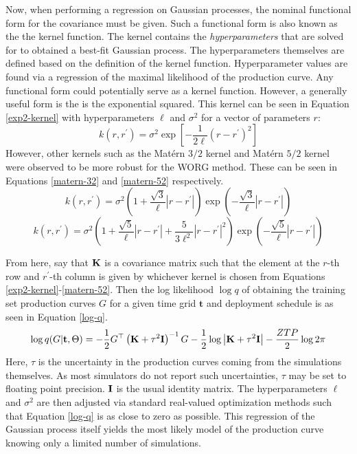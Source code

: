 Now, when performing a regression on Gaussian processes, 
the nominal functional form for the covariance must be given. 
Such a functional form is also known as the the kernel function.
The kernel contains the \emph{hyperparameters} that are solved for to 
obtained a best-fit Gaussian process. The hyperparameters themselves are
defined based on the definition of the kernel function. Hyperparameter 
values are found via a regression of the maximal likelihood of 
the production curve. Any functional form could potentially serve as a kernel
function. However, a generally useful form is the is the exponential 
squared. This kernel can be seen in Equation \ref{exp2-kernel} with 
hyperparameters $\ell$ and $\sigma^2$ for a vector of parameters $r$:
\begin{equation}
\label{exp2-kernel}
k(r, r^\prime) = \sigma^2 \exp\left[-\frac{1}{2\ell}(r - r^\prime)^2 \right]
\end{equation}
However, other kernels such as the Mat\'ern $3/2$ kernel and Mat\'ern $5/2$
kernel \cite{paciorek2004nonstationary} were observed to be more robust for 
the WORG method. These can be seen in Equations \ref{matern-32} and 
\ref{matern-52} respectively.
\begin{equation}
\label{matern-32}
k(r, r^\prime) = \sigma^2 
                 \left(1 + \frac{\sqrt{3}}{\ell}|r - r^\prime|\right)
                 \exp\left(-\frac{\sqrt{3}}{\ell}|r - r^\prime|\right)
\end{equation}
\begin{equation}
\label{matern-52}
k(r, r^\prime) = \sigma^2 
                 \left(1 + \frac{\sqrt{5}}{\ell}|r - r^\prime|
                         + \frac{5}{3\ell^2}|r - r^\prime|^2\right)
                 \exp\left(-\frac{\sqrt{5}}{\ell}|r - r^\prime|\right)
\end{equation}

From here, say that $\mathbf{K}$ is a covariance matrix 
such that the element at the $r$-th row and $r^\prime$-th column is 
given by whichever kernel is chosen from 
Equations \ref{exp2-kernel}-\ref{matern-52}. Then the 
log likelihood $\log q$ of obtaining the training set production curves 
$G$ for a given time grid $\mathbf{t}$ and deployment schedule is as 
seen in Equation \ref{log-q}.
\begin{equation}
\label{log-q}
\log q(G|\mathbf{t}, \Theta) 
    = -\frac{1}{2}G^\top\left(\mathbf{K} + \tau^2\mathbf{I}\right)^{-1}G
      -\frac{1}{2}\log\left|\mathbf{K} + \tau^2\mathbf{I}\right|
      -\frac{ZTP}{2}\log 2\pi
\end{equation}
Here, $\tau$ is the uncertainty in the production curves coming from the 
simulations themselves. As most simulators do not report such uncertainties, 
$\tau$ may be set to floating point precision. $\mathbf{I}$ is the usual identity 
matrix. The hyperparameters $\ell$ and $\sigma^2$ are then adjusted via 
standard real-valued optimization methods such that Equation \ref{log-q} is 
as close to zero as possible. 
This regression of the Gaussian process itself yields the most likely 
model of the production curve knowing only a limited number of simulations.

